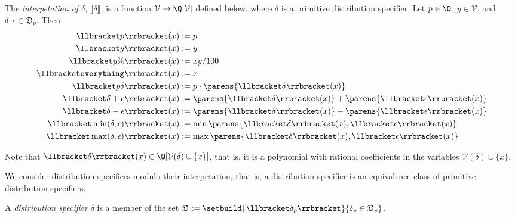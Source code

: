 \documentclass[10pt]{article}
\newcommand{\everything}{\textbf{\texttt{everything}}}
\begin{document}
\begin{definition}
    The \emph{interpetation of $\delta$}, $\llbracket \delta \rrbracket$, is a function $\mathcal{V} \to \Q[\mathcal{V}]$ defined below, where $\delta$ is a primitive distribution specifier.
    Let $p \in \Q$, $y \in \mathcal{V}$, and $\delta, \epsilon \in \mathfrak{D}_p$.
    Then
    \begin{align*}
        \llbracket p \rrbracket(x) &:= p \\
        \llbracket y \rrbracket(x) &:= y \\
        \llbracket y\% \rrbracket (x) &:= xy / 100 \\
        \llbracket \everything \rrbracket (x) &:= x \\
        \llbracket p \delta \rrbracket (x) &:= p \cdot \parens{ \llbracket \delta \rrbracket (x) }  \\
        \llbracket \delta + \epsilon \rrbracket(x) &:= \parens{\llbracket \delta \rrbracket (x)} + \parens{\llbracket \epsilon \rrbracket(x)} \\
        \llbracket \delta - \epsilon \rrbracket(x) &:= \parens{\llbracket \delta \rrbracket (x)} - \parens{\llbracket \epsilon \rrbracket(x)} \\
        \llbracket \min(\delta, \epsilon) \rrbracket(x) &:= \min\parens{\llbracket \delta \rrbracket (x), \llbracket \epsilon \rrbracket (x)} \\
        \llbracket \max(\delta, \epsilon) \rrbracket(x) &:= \max\parens{\llbracket \delta \rrbracket (x), \llbracket \epsilon \rrbracket (x)}
    \end{align*}
\end{definition}

Note that $\llbracket \delta \rrbracket (x) \in \Q[\mathcal{V}(\delta) \cup \{x\}]$, that is, it is a polynomial with rational coefficients in the variables $\mathcal{V}(\delta) \cup \{x\}$.

We consider distribution specifiers modulo their interpetation, that is, a distribution specifier is an equivalence class of primitive distribution specifiers.
\begin{definition}
    A \emph{distribution specifier} $\delta$ is a member of the set $\mathfrak{D} := \setbuild{\llbracket \delta_p \rrbracket}{\delta_p \in \mathfrak{D}_p}$.
\end{definition}
\end{document}
